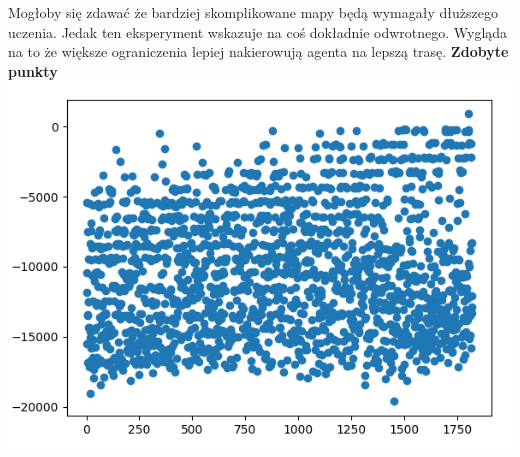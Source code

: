 \documentclass[a4paper,12pt]{article}
\begin{document}
Mogłoby się zdawać że bardziej skomplikowane mapy będą wymagały dłuższego uczenia. Jedak ten eksperyment wskazuje na coś dokładnie odwrotnego. Wygląda na to że większe ograniczenia lepiej nakierowują agenta na lepszą trasę. \newline \newline
\textbf{\Large{Zdobyte punkty}} \newline
\includegraphics[scale=0.9]{testy/wykres5.png}
\newline \newline
\end{document}
